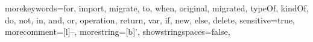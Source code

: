 {morekeywords={for, import, migrate, to, when, original, migrated, typeOf, kindOf, do, not, in, and, or, operation, return, var, if, new, else, delete},
sensitive=true,
morecomment=[l]{--},
morestring=[b]',
showstringspaces=false,
}
